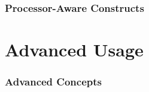 \documentclass[10pt]{article}
\begin{document}
\section{Processor-Aware Constructs}
  
  


\part{Advanced Usage}

\section{Advanced Concepts}

  
  
  
  
  
  
  
  
  
  
      
      
%  
  
  



%






\appendix


%






\end{document}
